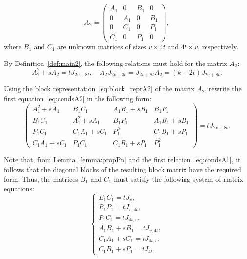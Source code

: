 \documentclass{article}
\begin{document}
\begin{equation}
\label{eq:block_reprA2}
A_2 = \left(
\begin{array}{cccc}
A_1 & 0 & B_1 & 0 \\
0 & A_1 & 0 & B_1 \\
0 & C_1 & 0 & P_1 \\
C_1 & 0 & P_1 & 0
\end{array}
\right),
\end{equation}
\noindent where $B_1$ and $C_1$ are unknown matrices of sizes $v \times 4t$ and $4t \times v$, respectively.

By Definition~\ref{def:main2}, the following relations must hold for the matrix $A_2$:
\begin{equation}
\label{eq:condsA2}
A_2^2 + sA_2 = tJ_{2v+8t}, \quad A_2 J_{2v+8t} = J_{2v+8t} A_2 = (k+2t) J_{2v+8t}.
\end{equation}

Using the block representation~\eqref{eq:block_reprA2} of the matrix $A_2$, rewrite the first equation~\eqref{eq:condsA2} in the following form:
\begin{equation}
\label{eq:block_repr_eq}
\left(
\begin{array}{c|c|c|c}
A_1^2+sA_1 & B_1 C_1 & A_1 B_1 + sB_1 & B_1 P_1 \\ \hline
B_1 C_1 & A_1^2+sA_1 & B_1 P_1 & A_1 B_1 + sB_1 \\ \hline
P_1 C_1 & C_1 A_1 + sC_1 & P_1^2 & C_1 B_1 + sP_1 \\ \hline
C_1 A_1 + sC_1 & P_1 C_1 & C_1 B_1 + sP_1 & P_1^2
\end{array}
\right) = tJ_{2v+8t}.
\end{equation}

Note that, from Lemma~\ref{lemma:propPn} and the first relation~\eqref{eq:condsA1}, it follows that the diagonal blocks of the resulting block matrix have the required form. Thus, the matrices $B_1$ and $C_1$ must satisfy the following system of matrix equations:
\begin{equation}
\label{eq:systemA2part1}
\begin{cases}
B_1 C_1 = tJ_v,\\
B_1 P_1 = tJ_{v, 4t},\\
P_1 C_1 = tJ_{4t, v},\\
A_1 B_1 + sB_1 = tJ_{v, 4t},\\
C_1 A_1 + sC_1 = tJ_{4t, v},\\
C_1 B_1 + sP_1 = tJ_{4t}.
\end{cases}
\end{equation}
\end{document}
